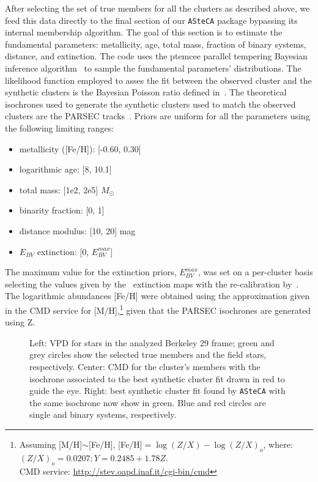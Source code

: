 \documentclass{aa}
\begin{document}
  After selecting the set of true members for all the clusters as described
  above, we feed this data directly to the final section of our 
  \texttt{ASteCA} package bypassing its internal membership algorithm. 
  The goal of this section is to estimate
  the fundamental parameters: metallicity, age, total mass, fraction of binary
  systems, distance, and extinction. The code uses the ptemcee parallel
  tempering Bayesian inference algorithm~\citep{ptemcee} to sample the
  fundamental parameters' distributions. The likelihood function employed to
  asses the fit between the observed cluster and the synthetic clusters is the
  Bayesian Poisson ratio defined in~\cite{Tremmel_2013}.
  The theoretical isochrones used to generate the
  synthetic clusters used to match the observed clusters are the PARSEC
  tracks~\citep{Bressan_2012}. Priors are uniform for all the parameters using
  the following limiting ranges:

  \begin{itemize}
   \item metallicity ([Fe/H]): [-0.60, 0.30]
   \item logarithmic age: [8, 10.1]
   \item total mass: [1e2, 2e5] $M_{\odot}$
   \item binarity fraction: [0, 1]
   \item distance modulus: [10, 20] mag
   \item $E_{BV}$ extinction: [0, $E_{BV}^{max}$]
  \end{itemize}

  \noindent The maximum value for the extinction priors, $E_{BV}^{max}$, was set
  on a per-cluster basis selecting the values given by the~\cite{Schlegel_1998}
  extinction maps with the re-calibration by~\cite{Schlafly_2011}.
  The logarithmic abundances [Fe/H] were obtained using the approximation given
  in the CMD service for [M/H],\footnote{Assuming [M/H]$\sim$[Fe/H], [Fe/H]$=\log(Z/X)-\log(Z/X)_{o}$, where:
  $(Z/X)_{o}=0.0207; Y=0.2485+1.78Z$.\\
  CMD service: \url{http://stev.oapd.inaf.it/cgi-bin/cmd}} given that the
  PARSEC isochrones are generated using Z.

  \begin{figure*}
   \caption{Left: VPD for stars in the analyzed Berkeley 29
    frame; green and grey circles show the selected true members and the field
    stars, respectively.
    Center: CMD for the cluster's members with the isochrone associated to the
    best synthetic cluster fit drawn in red to guide the eye.
    Right: best synthetic cluster fit found by \texttt{ASteCA} with the same
    isochrone now show in green. Blue and red circles are single and binary
    systems, respectively.}
   \label{fig:BER29_fpars}
  \end{figure*}
\end{document}
